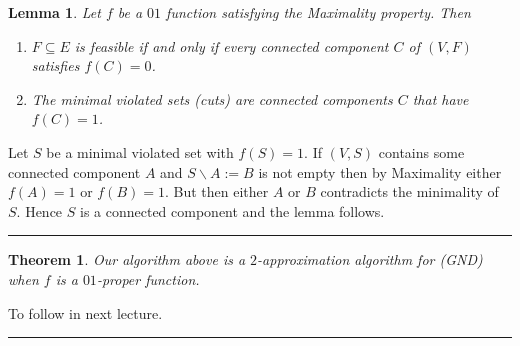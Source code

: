 \documentclass[letterpaper,12pt,oneside,onecolumn]{article}
\newenvironment{proof}{{\bf Proof:  }}{\hfill\rule{2mm}{2mm}}
\newtheorem{lemma}[fact]{Lemma}
\newtheorem{theorem}[fact]{Theorem}
\begin{document}
\begin{lemma}
Let $f$ be a $01$ function satisfying the Maximality property. Then
\begin{enumerate}
\item $F \subseteq E$ is feasible if and only if every connected component $C$ of $(V,F)$ satisfies $f(C) = 0$.
\item The minimal violated sets (cuts) are connected components $C$ that have $f(C) = 1$.
\end{enumerate}
\end{lemma}
\begin{proof}
Let $S$ be a minimal violated set with $f(S) = 1$. If $(V,S)$ contains some connected component $A$ and $S\backslash A := B$ is not empty then by Maximality either $f(A) = 1$ or $f(B) = 1$. But then either $A$ or $B$ contradicts the minimality of $S$. Hence $S$ is a connected component and the lemma follows.
\end{proof}
\begin{theorem}
Our algorithm above is a $2$-approximation algorithm for (GND) when $f$ is a $01$-proper function.
\end{theorem}
\begin{proof}
To follow in next lecture.
\end{proof}
\end{document}
